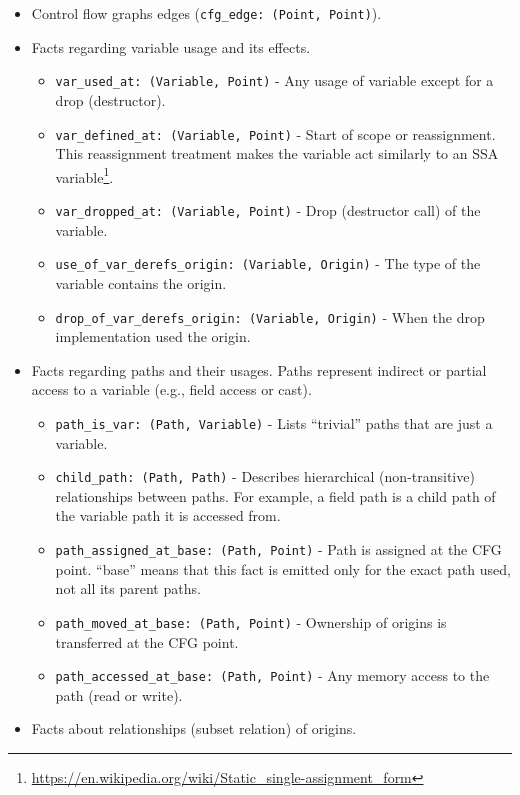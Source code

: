 \documentclass[
  11pt,
  twoside,symmetric]{report}
\providecommand{\tightlist}{%
  \setlength{\itemsep}{0pt}\setlength{\parskip}{0pt}}
\DeclareRobustCommand{\href}[2]{#2\footnote{\url{#1}}}
\begin{document}
\begin{itemize}
\tightlist
\item
  Control flow graphs edges (\texttt{cfg\_edge:\ (Point,\ Point)}).
\item
  Facts regarding variable usage and its effects.

  \begin{itemize}
  \tightlist
  \item
    \texttt{var\_used\_at:\ (Variable,\ Point)} - Any usage of variable
    except for a drop (destructor).
  \item
    \texttt{var\_defined\_at:\ (Variable,\ Point)} - Start of scope or
    reassignment. This reassignment treatment makes the variable act
    similarly to an
    \href{https://en.wikipedia.org/wiki/Static_single-assignment_form}{SSA
    variable}.
  \item
    \texttt{var\_dropped\_at:\ (Variable,\ Point)} - Drop (destructor
    call) of the variable.
  \item
    \texttt{use\_of\_var\_derefs\_origin:\ (Variable,\ Origin)} - The
    type of the variable contains the origin.
  \item
    \texttt{drop\_of\_var\_derefs\_origin:\ (Variable,\ Origin)} - When
    the drop implementation used the origin.
  \end{itemize}
\item
  Facts regarding paths and their usages. Paths represent indirect or
  partial access to a variable (e.g., field access or cast).

  \begin{itemize}
  \tightlist
  \item
    \texttt{path\_is\_var:\ (Path,\ Variable)} - Lists ``trivial'' paths
    that are just a variable.
  \item
    \texttt{child\_path:\ (Path,\ Path)} - Describes hierarchical
    (non-transitive) relationships between paths. For example, a field
    path is a child path of the variable path it is accessed from.
  \item
    \texttt{path\_assigned\_at\_base:\ (Path,\ Point)} - Path is
    assigned at the CFG point. ``base'' means that this fact is emitted
    only for the exact path used, not all its parent paths.
  \item
    \texttt{path\_moved\_at\_base:\ (Path,\ Point)} - Ownership of
    origins is transferred at the CFG point.
  \item
    \texttt{path\_accessed\_at\_base:\ (Path,\ Point)} - Any memory
    access to the path (read or write).
  \end{itemize}
\item
  Facts about relationships (subset relation) of origins.


\end{itemize}
\end{document}
